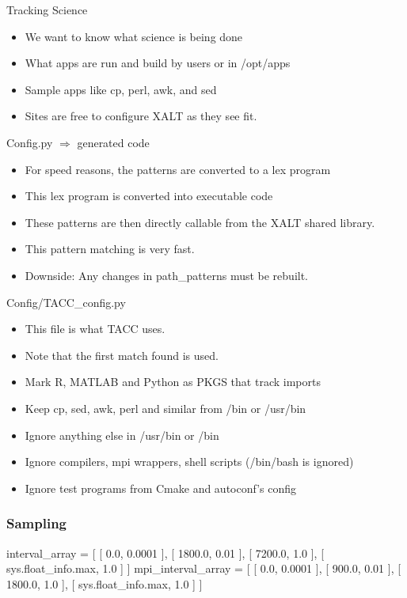 \documentclass{beamer}
\begin{document}
\begin{frame}{Tracking Science}
  \begin{itemize}
    \item We want to know what science is being done
    \item What apps are run and build by users or in /opt/apps
    \item Sample apps like cp, perl, awk, and sed
    \item Sites are free to configure XALT as they see fit.
  \end{itemize}
\end{frame}

\begin{frame}{Config.py $\Rightarrow$ generated code}
  \begin{itemize}
    \item For speed reasons, the patterns are converted to a lex program
    \item This lex program is converted into executable code
    \item These patterns are then directly callable from the XALT
      shared library.
    \item This pattern matching is very fast.
    \item Downside: Any changes in path\_patterns must be rebuilt.
  \end{itemize}
\end{frame}

\begin{frame}{Config/TACC\_config.py}
  \begin{itemize}
    \item This file is what TACC uses.
    \item Note that the first match found is used.
    \item Mark R, MATLAB and Python as PKGS that track imports
    \item Keep cp, sed, awk, perl and similar from /bin or /usr/bin
    \item Ignore anything else in /usr/bin or /bin
    \item Ignore compilers, mpi wrappers, shell scripts (/bin/bash is
      ignored)
    \item Ignore test programs from Cmake and autoconf's config
  \end{itemize}
\end{frame}

\begin{frame}[fragile]
    \frametitle{Sampling}
 {\small
    \begin{semiverbatim}
interval\_array = [
    [    0.0,              0.0001 ],
    [ 1800.0,              0.01   ],
    [ 7200.0,              1.0    ],
    [ sys.float\_info.max,  1.0    ]
]
mpi\_interval\_array = [
    [    0.0,              0.0001 ],
    [  900.0,              0.01   ],
    [ 1800.0,              1.0    ],
    [ sys.float\_info.max,  1.0    ]
]
    \end{semiverbatim}
}
\end{frame}
\end{document}
